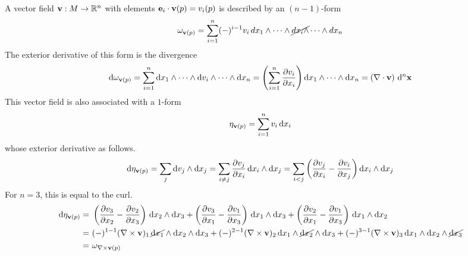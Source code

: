 \documentclass[11pt]{article}
\numberwithin{equation}{section}
\begin{document}
\begin{ex}
A vector field $\mathbf{v}: M\rightarrow\mathbb{R}^n$ with elements  $\mathbf{e}_i\cdot\mathbf{v}(p)=v_i(p)$ is described by an $(n-1)$-form
\begin{align}
  \omega _{\mathbf{v}(p)}
=
  \sum_{i=1}^n
  (-)^{i-1}
  v_i\,
  dx_1
  \wedge
  \cdots
  \wedge
  \cancel{
    dx_i
    \wedge
  }
  \cdots
  \wedge
  dx_n
\end{align}
The exterior derivative of this form is the divergence
\begin{align}
  \mathrm{d}
  \omega _{\mathbf{v}(p)}
=
  \sum_{i=1}^n
  \mathrm{d}x_1
  \wedge
  \cdots
  \wedge
  \mathrm{d}v_i
  \wedge
  \cdots
  \wedge
  \mathrm{d}x_n
=
  \left(
    \sum_{i=1}^n
    \frac {\partial v_i}{\partial x_i}
  \right)
  \mathrm{d}x_1
  \wedge
  \cdots
  \wedge
  \mathrm{d}x_n
=
  (\nabla\cdot\mathbf{v})\,\,
  \mathrm{d}^n\mathbf{x}
\end{align}
This vector field is also associated with a $1$-form
\begin{align}
  \eta _{\mathbf{v}(p)}
=
  \sum_{i=1}^n
  v_i\,
  \mathrm{d}x_i
\end{align}
whose exterior derivative as follows.
\begin{align}
  \mathrm{d}\eta _{\mathbf{v}(p)}
=
  \sum_j
  \mathrm{d}v_j\wedge\mathrm{d}x_j
=
  \sum_{i\neq j}
  \frac {\partial v_j}{\partial x_i}\,
  \mathrm{d}x_i
  \wedge
  \mathrm{d}x_j
=
  \sum_{i<j}
  \left(
    \frac {\partial v_j}{\partial x_i}
  -
    \frac {\partial v_i}{\partial x_j}
  \right)
  \mathrm{d}x_i
  \wedge
  \mathrm{d}x_j
\end{align}
For $n=3$, this is equal to the curl.
\begin{align*}
  \mathrm{d}\eta _{\mathbf{v}(p)}
=&\
  \left(
    \frac {\partial v_3}{\partial x_2}
  -
    \frac {\partial v_2}{\partial x_3}
  \right)\,
  \mathrm{d}x_2
  \wedge
  \mathrm{d}x_3
+
  \left(
    \frac {\partial v_3}{\partial x_1}
  -
    \frac {\partial v_1}{\partial x_3}
  \right)\,
  \mathrm{d}x_1
  \wedge
  \mathrm{d}x_3
+
  \left(
    \frac {\partial v_2}{\partial x_1}
  -
    \frac {\partial v_1}{\partial x_3}
  \right)\,
  \mathrm{d}x_1
  \wedge
  \mathrm{d}x_2
\\=&\
  (-)^{1-1}
  (\nabla\times\mathbf{v})_1\,
  \cancel{
    \mathrm{d}x_1
  }
  \wedge
  \mathrm{d}x_2
  \wedge
  \mathrm{d}x_3
+
  (-)^{2-1}
  (\nabla\times\mathbf{v})_2\,
  \mathrm{d}x_1
  \wedge
  \cancel{
    \mathrm{d}x_2
  }
  \wedge
  \mathrm{d}x_3
+
  (-)^{3-1}
  (\nabla\times\mathbf{v})_3\,
  \mathrm{d}x_1
  \wedge
  \mathrm{d}x_2
  \wedge
  \cancel{
    \mathrm{d}x_3
  }
\\=&\
  \omega _{\nabla\times\mathbf{v}(p)}
\end{align*}
\end{ex}
\end{document}
